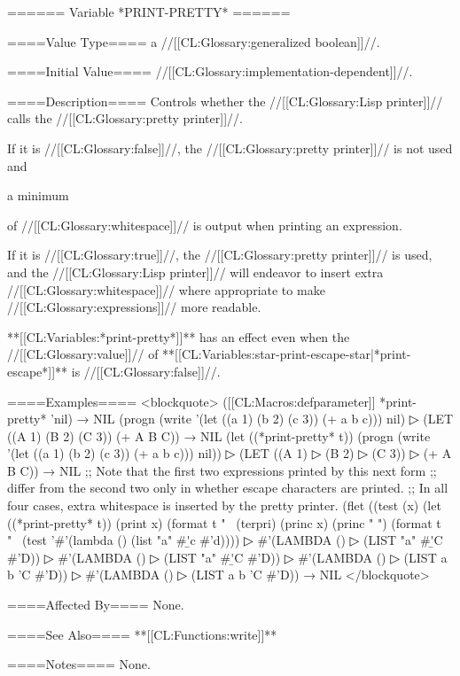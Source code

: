 ====== Variable *PRINT-PRETTY* ======

====Value Type====
a //[[CL:Glossary:generalized boolean]]//.

====Initial Value====
//[[CL:Glossary:implementation-dependent]]//.

====Description====
Controls whether the //[[CL:Glossary:Lisp printer]]// calls the //[[CL:Glossary:pretty printer]]//.

If it is //[[CL:Glossary:false]]//, the //[[CL:Glossary:pretty printer]]// is not used and

a minimum

of //[[CL:Glossary:whitespace]]// is output when printing an expression.

If it is //[[CL:Glossary:true]]//, the //[[CL:Glossary:pretty printer]]// is used, and the //[[CL:Glossary:Lisp printer]]// will endeavor to insert extra //[[CL:Glossary:whitespace]]// where appropriate to make //[[CL:Glossary:expressions]]// more readable.

**[[CL:Variables:*print-pretty*]]** has an effect even when the //[[CL:Glossary:value]]// of **[[CL:Variables:star-print-escape-star|*print-escape*]]** is //[[CL:Glossary:false]]//.

====Examples====
<blockquote> ([[CL:Macros:defparameter]] *print-pretty* 'nil) → NIL (progn (write '(let ((a 1) (b 2) (c 3)) (+ a b c))) nil)
▷ (LET ((A 1) (B 2) (C 3)) (+ A B C)) → NIL (let ((*print-pretty* t)) (progn (write '(let ((a 1) (b 2) (c 3)) (+ a b c))) nil))
▷ (LET ((A 1)
▷ (B 2)
▷ (C 3))
▷ (+ A B C)) → NIL ;; Note that the first two expressions printed by this next form ;; differ from the second two only in whether escape characters are printed. ;; In all four cases, extra whitespace is inserted by the pretty printer. (flet ((test (x) (let ((*print-pretty* t)) (print x) (format t "~ (terpri) (princ x) (princ " ") (format t "~ (test '#'(lambda () (list "a" #\b 'c #'d))))
▷ #'(LAMBDA ()
▷ (LIST "a" #\b 'C #'D))
▷ #'(LAMBDA ()
▷ (LIST "a" #\b 'C #'D))
▷ #'(LAMBDA ()
▷ (LIST a b 'C #'D))
▷ #'(LAMBDA ()
▷ (LIST a b 'C #'D)) → NIL </blockquote>

====Affected By====
None.

====See Also====
**[[CL:Functions:write]]**

====Notes====
None.

 

